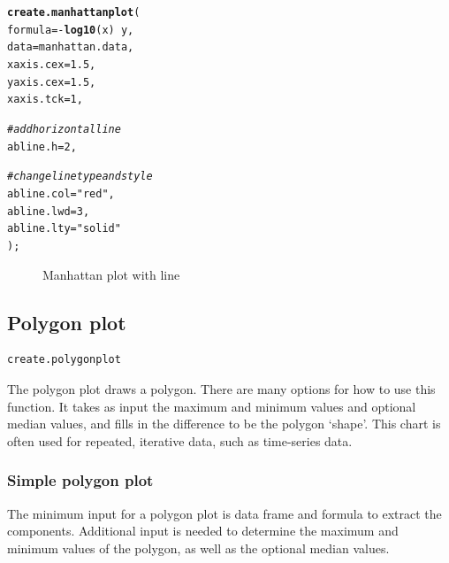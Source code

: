 \documentclass[letterpaper]{article}\usepackage[]{graphicx}\usepackage[]{color}
\makeatletter
\newcommand{\hlnum}[1]{\textcolor[rgb]{0.686,0.059,0.569}{#1}}%
\newcommand{\hlstr}[1]{\textcolor[rgb]{0.192,0.494,0.8}{#1}}%
\newcommand{\hlcom}[1]{\textcolor[rgb]{0.678,0.584,0.686}{\textit{#1}}}%
\newcommand{\hlopt}[1]{\textcolor[rgb]{0,0,0}{#1}}%
\newcommand{\hlstd}[1]{\textcolor[rgb]{0.345,0.345,0.345}{#1}}%
\newcommand{\hlkwc}[1]{\textcolor[rgb]{0.333,0.667,0.333}{#1}}%
\newcommand{\hlkwd}[1]{\textcolor[rgb]{0.737,0.353,0.396}{\textbf{#1}}}%
\newenvironment{kframe}{%
 \def\at@end@of@kframe{}%
 \ifinner\ifhmode%
  \def\at@end@of@kframe{\end{minipage}}%
  \begin{minipage}{\columnwidth}%
 \fi\fi%
 \def\FrameCommand##1{\hskip\@totalleftmargin \hskip-\fboxsep
 \colorbox{shadecolor}{##1}\hskip-\fboxsep
     \hskip-\linewidth \hskip-\@totalleftmargin \hskip\columnwidth}%
 \MakeFramed {\advance\hsize-\width
   \@totalleftmargin\z@ \linewidth\hsize
   \@setminipage}}%
 {\par\unskip\endMakeFramed%
 \at@end@of@kframe}
\newenvironment{knitrout}{}{} %
\makeatother
\begin{document}
\begin{knitrout}
\color{fgcolor}\begin{kframe}
\begin{alltt}
\hlkwd{create.manhattanplot}\hlstd{(}
    \hlkwc{formula} \hlstd{=} \hlopt{-}\hlkwd{log10}\hlstd{(x)} \hlopt{~} \hlstd{y,}
    \hlkwc{data} \hlstd{= manhattan.data,}
    \hlkwc{xaxis.cex} \hlstd{=} \hlnum{1.5}\hlstd{,}
    \hlkwc{yaxis.cex} \hlstd{=} \hlnum{1.5}     \hlstd{,}
    \hlkwc{xaxis.tck} \hlstd{=} \hlnum{1}\hlstd{,}

    \hlcom{# add horizontal line}
    \hlkwc{abline.h} \hlstd{=} \hlnum{2}\hlstd{,}

    \hlcom{# change line type and style}
    \hlkwc{abline.col} \hlstd{=} \hlstr{"red"}\hlstd{,}
    \hlkwc{abline.lwd} \hlstd{=} \hlnum{3}\hlstd{,}
    \hlkwc{abline.lty} \hlstd{=} \hlstr{"solid"}
    \hlstd{);}
\end{alltt}
\end{kframe}\begin{figure}

{\centering {} 

}

\caption[Manhattan plot with line]{Manhattan plot with line\label{fig:manhattan2}}
\end{figure}


\end{knitrout}

\subsection{Polygon plot}
\begin{verbatim}
create.polygonplot
\end{verbatim}

The polygon plot draws a polygon. There are many options for how to use this function. It takes as input the maximum and minimum values and optional median values, and fills in the difference to be the polygon `shape'. This chart is often used for repeated, iterative data, such as time-series data.

\subsubsection{Simple polygon plot}
The minimum input for a polygon plot is data frame and formula to extract the components. Additional input is needed to determine the maximum and minimum values of the polygon, as well as the optional median values.
\end{document}
